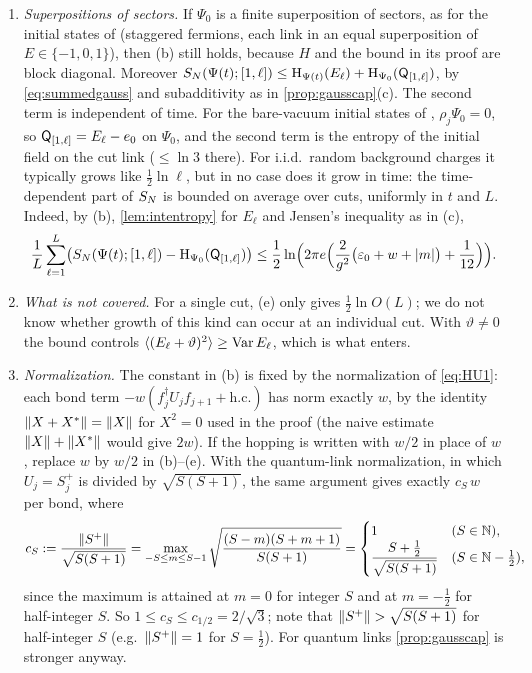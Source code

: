 \begin{remark}\label{rem:wilson}
\leavevmode
\begin{enumerate}[label=(\alph*)]
\item \emph{Superpositions of sectors.}  If $\Psi_0$ is a finite superposition of sectors, as for the initial
states of \cite{Brenes2018} (staggered fermions, each link in an equal superposition of $E\in\{-1,0,1\}$), then
(b) still holds, because $H$ and the bound in its proof are block diagonal.  Moreover
$S_{N}(\Psi(t);[1,\ell])\le\mathrm{H}_{\Psi(t)}(E_\ell)+\mathrm{H}_{\Psi_0}(\mathsf{Q}_{[1,\ell]})$, by \eqref{eq:summedgauss} and
subadditivity as in \cref{prop:gausscap}(c).  The second term is independent of time.  For the bare-vacuum
initial states of \cite{Brenes2018}, $\rho_j\Psi_0=0$, so $\mathsf{Q}_{[1,\ell]}=E_\ell-e_0$ on $\Psi_0$, and the second term is
the entropy of the initial field on the cut link ($\le\ln3$ there).  For i.i.d.\ random background charges it
typically grows like $\frac12\ln\ell$, but in no case does it grow in time: the time-dependent part of $S_{N}$ is
bounded on average over cuts, uniformly in $t$ and $L$.  Indeed, by (b), \cref{lem:intentropy} for $E_\ell$ and Jensen's
inequality as in (c),
\[
  \frac1L\sum_{\ell=1}^L\bigl(S_{N}(\Psi(t);[1,\ell])-\mathrm{H}_{\Psi_0}(\mathsf{Q}_{[1,\ell]})\bigr)
  \le\frac12\ln\Bigl(2\pi e\Bigl(\frac2{g^2}\bigl(\varepsilon_0+w+\left|m\right|\bigr)+\frac1{12}\Bigr)\Bigr).
\]
\item \emph{What is not covered.}  For a single cut, (e) only gives $\frac12\ln O(L)$; we do not know whether
growth of this kind can occur at an individual cut.  With $\vartheta\neq0$ the bound controls
$\langle(E_\ell+\vartheta)^2\rangle\ge\operatorname{Var} E_\ell$, which is what enters.
\item \emph{Normalization.}  The constant in (b) is fixed by the normalization of \eqref{eq:HU1}: each bond term
$-w(f_j^\dagger U_jf_{j+1}+\text{h.c.})$ has norm exactly $w$, by the identity $\left\|X+X^*\right\|=\left\|X\right\|$ for $X^2=0$ used in
the proof (the naive estimate $\left\|X\right\|+\left\|X^*\right\|$ would give $2w$).  If the hopping is written with $w/2$ in
place of $w$, replace $w$ by $w/2$ in (b)--(e).  With the quantum-link normalization, in which $U_j=S^+_j$ is divided
by $\sqrt{S(S+1)}$, the same argument gives exactly $c_S\,w$ per bond, where
\[
  c_S:=\frac{\left\|S^+\right\|}{\sqrt{S(S+1)}}=\max_{-S\le m\le S-1}\sqrt{\frac{(S-m)(S+m+1)}{S(S+1)}}
  =\begin{cases}1 & (S\in\mathbb{N}),\\ \dfrac{S+\frac12}{\sqrt{S(S+1)}} & (S\in\mathbb{N}-\frac12),\end{cases}
\]
since the maximum is attained at $m=0$ for integer $S$ and at $m=-\frac12$ for half-integer $S$.  So $1\le c_S\le
c_{1/2}=2/\sqrt3$; note that $\norm{S^+}>\sqrt{S(S+1)}$ for half-integer $S$ (e.g.\ $\left\|S^+\right\|=1$ for $S=\frac12$).
For quantum links \cref{prop:gausscap} is stronger anyway.
\end{enumerate}
\end{remark}

